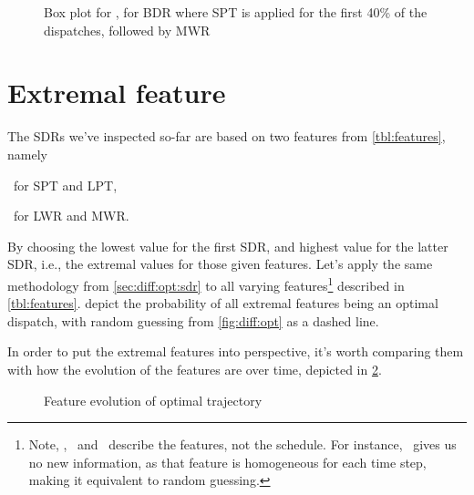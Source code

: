 \begin{figure}
\centering
{}
\caption{Box plot for \namerho, for BDR where SPT is applied for the first 40\% of the dispatches, followed by MWR}
\label{fig:diff:boxplot:BDR}
\end{figure}


\section{Extremal feature}\label{sec:diff:opt:ext}
The SDRs we've inspected so-far are based on two features from \cref{tbl:features}, namely
\begin{inparaenum}[(i)]
\item \phiproc\ for SPT and LPT, 
\item \phiwrmJob\ for LWR and MWR. 
\end{inparaenum}
By choosing the lowest value for the first SDR, and highest value for the latter SDR, i.e., the extremal values for those given features. Let's apply the same methodology from \cref{sec:diff:opt:sdr} to all varying features\footnote{Note, \phistep, \phimac\ and \phiwrmTotal\ describe the features, not the schedule. For instance, \phistep\, gives us no new information, as that feature is homogeneous for each time step, making it equivalent to random guessing.} described in \cref{tbl:features}. 
depict the probability of all extremal features being an optimal dispatch, with random guessing from \cref{fig:diff:opt} as a dashed line. 

In order to put the extremal features into perspective, it's worth comparing them with how the evolution of the features are over time, depicted in \cref{fig:diff:opt:evol}. 

\begin{figure}
\centering
{}
\caption{Feature evolution of optimal trajectory}
\label{fig:diff:opt:evol}
\end{figure}
\begin{figure}[p]\centering
\ContinuedFloat
{}
\end{figure}
\begin{figure}[p]\centering
\ContinuedFloat
{}
\end{figure}

